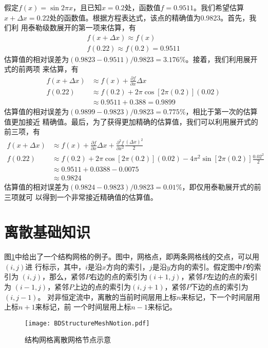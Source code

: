 假定$f(x)=\sin{2\pi x}$，且已知$x=0.2$处，函数值$f=0.9511$。我们希望估算
$x+\Delta x=0.22$处的函数值。根据方程表达式，该点的精确值为0.9823。首先，我们利
用泰勒级数展开的第一项来估算，有
\begin{equation}
  \begin{aligned}
    f(x+\Delta x) \approx f(x)  \\
    f(0.22) \approx f(0.2) = 0.9511
  \end{aligned} 
\end{equation}
估算值的相对误差为$(0.9823-0.9511)/0.9823=3.176\%$。接着，我们利用展开式的前两项
来估算，有
\begin{equation}
  \begin{aligned}
    f(x+\Delta x) &\approx f(x) + \frac{\partial f}{\partial x}\Delta x
  \\
    f(0.22) &\approx f(0.2) + 2\pi\cos{[2\pi(0.2)]}(0.02)
    \\
            &\approx 0.9511 + 0.388 = 0.9899
\end{aligned}
\end{equation}
估算值的相对误差为$(0.9899-0.9823)/0.9823=0.775\%$，相比于第一次的估算值更加接近
精确值。最后，为了获得更加精确的估算值，我们可以利用展开式的前三项，有
\begin{equation}
  \begin{aligned}
    f(x+\Delta x) &\approx f(x) + \frac{\partial f}{\partial x}\Delta x
    +
    \frac{\partial^{2} f}{\partial x^{2}}\frac{(\Delta x)^{2}}{2}
  \\
    f(0.22) &\approx f(0.2) + 2\pi\cos{[2\pi(0.2)]}(0.02) -
    4\pi^{2}\sin{[2\pi(0.2)]}\frac{0.02^{2}}{2}
    \\
            &\approx 0.9511 + 0.0388 - 0.0075
    \\
            &\approx 0.9824
\end{aligned}
\end{equation}
估算值的相对误差为$(0.9824-0.9823)/0.9823=0.01\%$，即仅用泰勒展开式的前三项就可
以得到一个非常接近精确值的估算值。

\section{离散基础知识}
图\ref{FgBD_SMN}中给出了一个结构网格的例子。图中，网格点，即两条网格线的交点，可以用$(i,j)$进
行标示，其中，$i$是沿$x$方向的索引，$j$是沿$y$方向的索引。假定图中$P$的索引为
$(i,j)$，那么，紧邻$P$右边的点的索引为$(i+1,j)$，紧邻$P$左边的点的索引为
$(i-1,j)$，紧邻$P$上边的点的索引为$(i,j+1)$，紧邻$P$下边的点的索引为$(i,j-1)$。
对非恒定流中，离散的当前时间层用上标$n$来标记，下一个时间层用上标$n+1$来标记，前
一个时间层用上标$n-1$来标记。
\begin{figure}[h]
  \centering
  \texttt{[image: BDStructureMeshNotion.pdf]}
  \caption{结构网格离散网格节点示意}
  \label{FgBD_SMN}
\end{figure}

